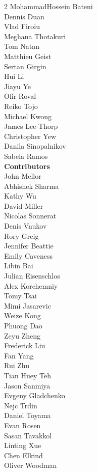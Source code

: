 \begin{multicols}{2}
MohammadHossein Bateni \\
Dennis Duan \\
Vlad Firoiu \\
Meghana Thotakuri \\
Tom Natan \\
Matthieu Geist \\
Sertan Girgin \\
Hui Li \\
Jiayu Ye \\
Ofir Roval \\
Reiko Tojo \\
Michael Kwong \\
James Lee-Thorp \\
Christopher Yew \\
Danila Sinopalnikov \\
Sabela Ramos \\
\textbf{Contributors} \\
John Mellor \\
Abhishek Sharma \\
Kathy Wu \\
David Miller \\
Nicolas Sonnerat \\
Denis Vnukov \\
Rory Greig \\
Jennifer Beattie \\
Emily Caveness \\
Libin Bai \\
Julian Eisenschlos \\
Alex Korchemniy \\
Tomy Tsai \\
Mimi Jasarevic \\
Weize Kong \\
Phuong Dao \\
Zeyu Zheng \\
Frederick Liu \\
Fan Yang \\
Rui Zhu \\
Tian Huey Teh \\
Jason Sanmiya \\
Evgeny Gladchenko \\
Nejc Trdin \\
Daniel Toyama \\
Evan Rosen \\
Sasan Tavakkol \\
Linting Xue \\
Chen Elkind \\
Oliver Woodman \\

\end{multicols}

